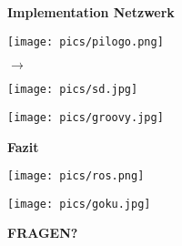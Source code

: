 \documentclass{beamer}
\begin{document}
\begin{frame}
{\bf Implementation Netzwerk}
\parbox{4cm}{\texttt{[image: pics/pilogo.png]}}
\hspace{0.5cm} 
$\rightarrow$
\parbox{4cm}{\texttt{[image: pics/sd.jpg]}}\cite{sd}
\end{frame}


\begin{frame}
\centerline{\texttt{[image: pics/groovy.jpg]}}\cite{groovy}
\end{frame}

\begin{frame}
{\bf Fazit}
\centerline{\texttt{[image: pics/ros.png]}}\cite{ros}
\end{frame}

\begin{frame}
\centerline{\texttt{[image: pics/goku.jpg]}}\cite{goku}
\vspace{2cm}
\centerline{{\bf \Huge FRAGEN?}}
\end{frame}
\end{document}

